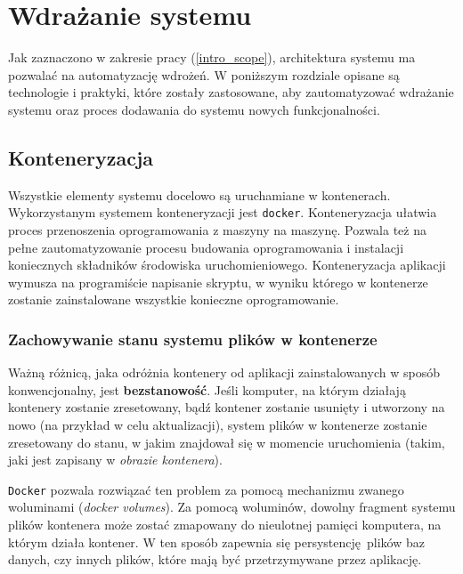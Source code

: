 \chapter{Wdrażanie systemu} \label{chapter_deployment}

Jak zaznaczono w zakresie pracy (\ref{intro_scope}),
architektura systemu ma pozwalać na automatyzację wdrożeń.
W poniższym rozdziale opisane są technologie i praktyki, które zostały 
zastosowane, aby zautomatyzować wdrażanie systemu oraz proces
dodawania do systemu nowych funkcjonalności.

\section{Konteneryzacja}

Wszystkie elementy systemu docelowo są uruchamiane w kontenerach.
Wykorzystanym systemem konteneryzacji jest \texttt{docker}\cite{docker}.
Konteneryzacja ułatwia proces przenoszenia oprogramowania 
z maszyny na maszynę. Pozwala też na pełne zautomatyzowanie
procesu budowania oprogramowania i instalacji koniecznych
składników środowiska uruchomieniowego. Konteneryzacja
aplikacji wymusza na programiście napisanie skryptu, w wyniku
którego w kontenerze zostanie zainstalowane wszystkie konieczne 
oprogramowanie.

\subsection{Zachowywanie stanu systemu plików w kontenerze} \label{volumes}

Ważną różnicą, jaka odróżnia kontenery od aplikacji zainstalowanych
w sposób konwencjonalny, jest \textbf{bezstanowość}. Jeśli komputer,
na którym działają kontenery zostanie zresetowany, bądź kontener zostanie
usunięty i utworzony na nowo (na przykład w celu aktualizacji), system
plików w kontenerze zostanie zresetowany do stanu, w jakim znajdował się 
w momencie uruchomienia (takim, jaki jest zapisany w \textit{obrazie kontenera}).

\texttt{Docker} pozwala rozwiązać ten problem za pomocą mechanizmu zwanego 
woluminami (\textit{docker volumes})\cite{docker_volumes}.
Za pomocą woluminów, dowolny fragment systemu
plików kontenera może zostać zmapowany do nieulotnej pamięci komputera, na którym 
działa kontener. W ten sposób zapewnia się persystencję plików baz danych, czy innych
plików, które mają być przetrzymywane przez aplikację.\\ %

